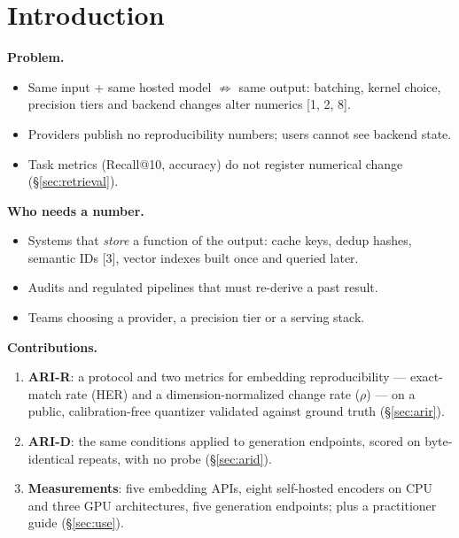 \documentclass{article}
\newcommand{\rhoc}{\rho}
\begin{document}
\section{Introduction}\label{sec:intro}
\textbf{Problem.}
\begin{itemize}
  \item Same input + same hosted model $\not\Rightarrow$ same output: batching, kernel choice, precision tiers and backend changes alter numerics [1, 2, 8].
  \item Providers publish no reproducibility numbers; users cannot see backend state.
  \item Task metrics (Recall@10, accuracy) do not register numerical change (\S\ref{sec:retrieval}).
\end{itemize}
\textbf{Who needs a number.}
\begin{itemize}
  \item Systems that \emph{store} a function of the output: cache keys, dedup hashes, semantic IDs [3], vector indexes built once and queried later.
  \item Audits and regulated pipelines that must re-derive a past result.
  \item Teams choosing a provider, a precision tier or a serving stack.
\end{itemize}
\textbf{Contributions.}
\begin{enumerate}[label=(\arabic*)]
  \item \textbf{ARI-R}: a protocol and two metrics for embedding reproducibility --- exact-match rate (HER) and a dimension-normalized change rate ($\rhoc$) --- on a public, calibration-free quantizer validated against ground truth (\S\ref{sec:arir}).
  \item \textbf{ARI-D}: the same conditions applied to generation endpoints, scored on byte-identical repeats, with no probe (\S\ref{sec:arid}).
  \item \textbf{Measurements}: five embedding APIs, eight self-hosted encoders on CPU and three GPU architectures, five generation endpoints; plus a practitioner guide (\S\ref{sec:use}).
\end{enumerate}

\end{document}
